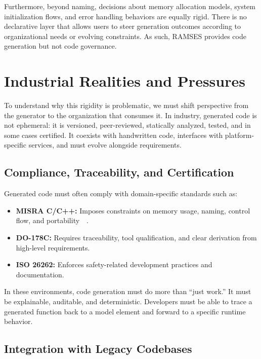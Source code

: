 Furthermore, beyond naming, decisions about memory allocation models, system initialization flows, and error handling behaviors are equally rigid. There is no declarative layer that allows users to steer generation outcomes according to organizational needs or evolving constraints. As such, RAMSES provides code generation but not code governance.

\section{Industrial Realities and Pressures}
\label{sec:industrial_realities}

To understand why this rigidity is problematic, we must shift perspective from the generator to the organization that consumes it. In industry, generated code is not ephemeral: it is versioned, peer-reviewed, statically analyzed, tested, and in some cases certified. It coexists with handwritten code, interfaces with platform-specific services, and must evolve alongside requirements.

\subsection*{Compliance, Traceability, and Certification}

Generated code must often comply with domain-specific standards such as:

\begin{itemize}
	\item \textbf{MISRA C/C++:} Imposes constraints on memory usage, naming, control flow, and portability~\cite{Misra_C_2025}~\cite{Misra_Cpp_2023}.
	\item \textbf{DO-178C:} Requires traceability, tool qualification, and clear derivation from high-level requirements. 
	\item \textbf{ISO 26262:} Enforces safety-related development practices and documentation.
\end{itemize}

In these environments, code generation must do more than “just work.” It must be explainable, auditable, and deterministic. Developers must be able to trace a generated function back to a model element and forward to a specific runtime behavior.

\subsection*{Integration with Legacy Codebases}

